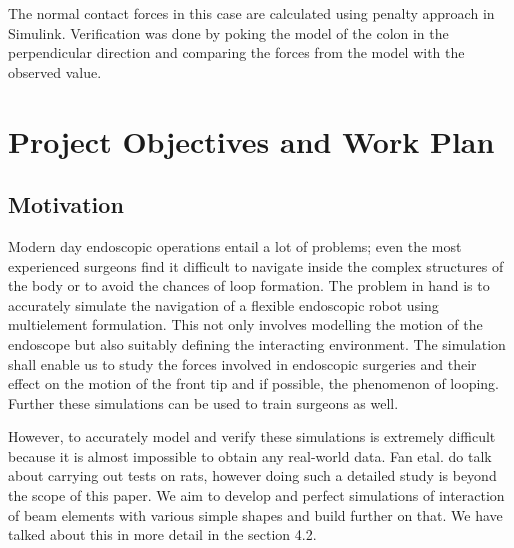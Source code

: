 \documentclass[12pt]{report}
\begin{document}
\par

\par

The normal contact forces in this case are calculated using penalty approach in Simulink. Verification was done by poking the model of the colon in the perpendicular direction and comparing the forces from the model with the observed value.\par




\newpage

\vspace{\baselineskip}\section*{Project Objectives and Work Plan}
\subsection*{Motivation}
Modern day endoscopic operations entail a lot of problems; even the most experienced surgeons find it difficult to navigate inside the complex structures of the body or to avoid the chances of loop formation. The problem in hand is to accurately simulate the navigation of a flexible endoscopic robot using multielement formulation. This not only involves modelling the motion of the endoscope but also suitably defining the interacting environment. The simulation shall enable us to study the forces involved in endoscopic surgeries and their effect on the motion of the front tip and if possible, the phenomenon of looping. Further these simulations can be used to train surgeons as well.\par

However, to accurately model and verify these simulations is extremely difficult because it is almost impossible to obtain any real-world data. Fan etal. \cite{fanTwolayeredMechanicalModel2004} do talk about carrying out tests on rats, however doing such a detailed study is beyond the scope of this paper. We aim to develop and perfect simulations of interaction of beam elements with various simple shapes and build further on that. We have talked about this in more detail in the section 4.2.\par
\end{document}
